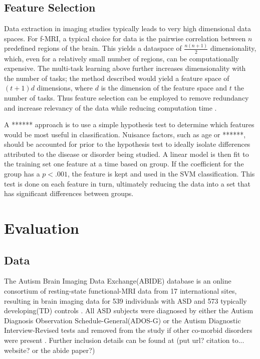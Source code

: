 \documentclass{llncs}
\begin{document}
\subsection{Feature Selection}
\label{subsec:FS}
Data extraction in imaging studies typically leads to very high dimensional data spaces.  For f-MRI, a typical choice for data is the pairwise correlation between $n$ predefined regions of the brain.  This yields a dataspace of $\frac{n(n+1)}{2}$ dimensionality, which, even for a relatively small number of regions, can be  computationally expensive.  The multi-task learning above further increases dimensionality with the number of tasks; the method described would yield a feature space of $(t+1)d$ dimensions, where $d$ is the dimension of the feature space and $t$ the number of tasks.  Thus feature selection can be employed to remove redundancy and increase relevancy of the data while reducing computation time \cite{featsel}.

A ****** approach is to use a simple hypothesis test to determine which features would be most useful in classification.  Nuisance factors, such as age or ******, should be accounted for prior to the hypothesis test to ideally isolate differences attributed to the disease or disorder being studied.  A linear model is then fit to the training set one feature at a time based on group.  If the coefficient for the group  has a $p < .001$, the feature is kept and used in the SVM classification. This test is done on each feature in turn, ultimately reducing the data into a set that has significant differences between groups.
\section{Evaluation}
\subsection{Data}
The Autism Brain Imaging Data Exchange(ABIDE) database is an online consortium of resting-state functional-MRI data from 17 international sites, resulting in brain imaging data for 539 individuals with ASD and 573 typically developing(TD)  controls \cite{abide}. All ASD subjects were diagnosed by either the Autism Diagnosis Observation Schedule-General(ADOS-G) or the Autism Diagnostic Interview-Revised tests and removed from the study if other co-morbid disorders were present \cite{lordADOS} \cite{lordADIR} \cite{abide}.  Further inclusion details can be found at (put url? citation to... website? or the abide paper?)
\end{document}
